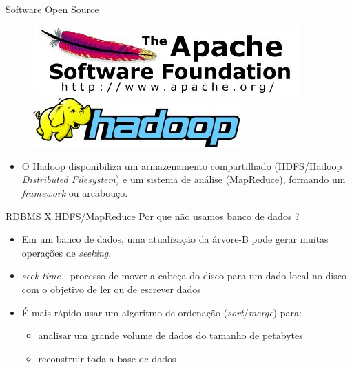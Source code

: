 \begin{frame}{Software Open Source}
   \begin{figure}[hb]
     \centering
     \includegraphics[scale=0.2]{asf-logo.jpg}
      \includegraphics[scale=2]{hadoop-logo.jpg}
     \label{fig16:afs}
   \end{figure}

     \begin{itemize}
        \item<1-> O Hadoop disponibiliza um armazenamento compartilhado (HDFS/Hadoop \emph{Distributed Filesystem}) e um sistema de análise (MapReduce), formando um \emph{framework} ou arcabouço.
     \end{itemize}
  \end{frame}

  \begin{frame}{RDBMS X HDFS/MapReduce}
    Por que não usamos banco de dados ?
     \begin{itemize}
        \item<1->  Em um banco de dados, uma atualização da árvore-B pode gerar muitas operações de \emph{seeking}.
        \item<2->  \emph{seek time} - processo de mover a cabeça do disco para um dado local no disco com o objetivo de ler ou de escrever dados
        \item<3->  É mais rápido usar um algoritmo de ordenação (\emph{sort}/\emph{merge}) para:
          \begin{itemize}
             \item<4-> analisar um grande volume de dados do tamanho de petabytes
             \item<5-> reconstruir toda a base de dados
          \end{itemize}
      \end{itemize}
  \end{frame}


